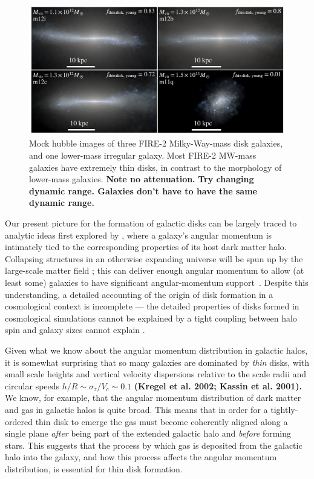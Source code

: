 \documentclass[fleqn,usenatbib]{mnras}
\begin{document}
\begin{figure}
    \centering
    \includegraphics[width=\textwidth]{figures/stars.pdf}
    \caption{
    Mock hubble images of three FIRE-2 Milky-Way-mass disk galaxies, and one lower-mass irregular galaxy.
    Most FIRE-2 MW-mass galaxies have extremely thin disks, in contrast to the morphology of lower-mass galaxies.
    \textbf{Note no attenuation.}
    \textbf{
    Try changing dynamic range.
    Galaxies don't have to have the same dynamic range.
    }
    }
    \label{f: stars}
\end{figure}

Our present picture for the formation of galactic disks can be largely traced to analytic ideas first explored by \citet{fall1980}, where a galaxy's angular momentum is intimately tied to the corresponding properties of its host dark matter halo.
Collapsing structures in an otherwise expanding universe will be spun up by the large-scale matter field \citep{Peebles69};
this can deliver enough angular momentum to allow (at least some) galaxies to have significant angular-momentum support~\citep[e.g.][]{MMW98}. 
Despite this understanding, a detailed accounting of the origin of disk formation in a cosmological context is incomplete --- the detailed properties of disks formed in cosmological simulations cannot be explained by a tight coupling between halo spin and galaxy sizes cannot explain \citep[e.g.][]{GK18}.  

Given what we know about the angular momentum distribution in galactic halos, it is somewhat surprising that so many galaxies are dominated by {\em thin} disks, with small scale heights and vertical velocity dispersions relative to the scale radii and circular speeds $h/R \sim \sigma_z/V_c \sim 0.1$ \textbf{(Kregel et al. 2002; Kassin et al. 2001).}
We know, for example, that the angular momentum distribution of dark matter \citep{B01} and gas \citep{Stewart13,DeFelippis2020} in galactic halos is quite broad.
This means that in order for a tightly-ordered thin disk to emerge the gas must become coherently aligned along a single plane \textit{after} being part of the extended galactic halo and \textit{before} forming stars.
This suggests that the process by which gas is deposited from the galactic halo into the galaxy, and how this process affects the angular momentum distribution, is essential for thin disk formation.
 
\end{document}
